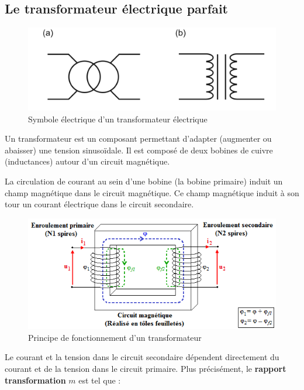 \documentclass[10pt,fleqn]{article} %
\begin{document}
\subsection{Le transformateur électrique parfait}
\begin{figure}
  \centering
  \includegraphics{images/Symb-transfo}
  \caption{Symbole électrique d'un transformateur électrique}
  \label{fig:symb_transfo}
\end{figure}
Un transformateur est un composant permettant d'adapter (augmenter ou abaisser) une tension sinusoïdale. Il est composé de deux bobines de cuivre (inductances) autour d'un circuit magnétique.

La circulation de courant au sein d'une bobine (la bobine primaire) induit un champ magnétique dans le circuit magnétique. Ce champ magnétique induit à son tour un courant électrique dans le circuit secondaire.

\begin{figure}[h]
  \centering
  \includegraphics[width=.6\textwidth]{images/transfo_principe}
  \caption{Principe de fonctionnement d'un transformateur}
  \label{fig:principe}
\end{figure}


\begin{aretenir}
  Le courant et la tension dans le circuit secondaire dépendent directement du courant et de la tension dans le circuit primaire. Plus précisément, le \textbf{rapport transformation} $m$ est tel que :
  \begin{center}
  \end{center}
\end{aretenir}
\end{document}
